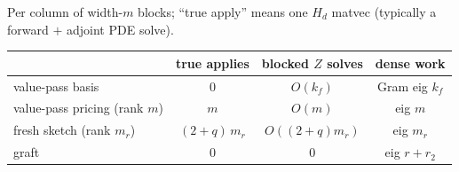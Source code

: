 \documentclass[11pt]{article}
\begin{document}
Per column of width-$m$ blocks; ``true apply'' means one $H_d$ matvec
(typically a forward $+$ adjoint PDE solve).

\begin{center}
\begin{tabular}{lccc}
\toprule
 & true applies & blocked $Z$ solves & dense work \\
\midrule
value-pass basis            & $0$        & $O(k_f)$ & Gram eig $k_f$ \\
value-pass pricing (rank $m$) & $m$      & $O(m)$   & eig $m$ \\
fresh sketch (rank $m_r$)   & $(2{+}q)\,m_r$ & $O((2{+}q)m_r)$ & eig $m_r$ \\
graft                       & $0$        & $0$      & eig $r + r_2$ \\
\bottomrule
\end{tabular}
\end{center}
\end{document}
